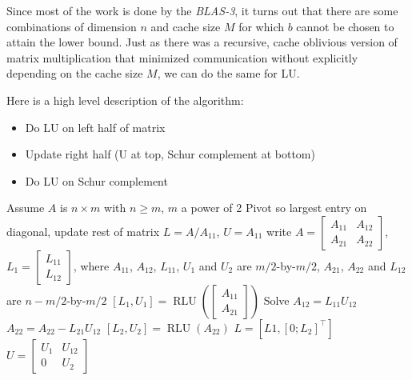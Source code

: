\documentclass[11pt]{article}
\numberwithin{equation}{section}
\begin{document}
Since most of the work is done by the \textit{BLAS-3}, it turns out that there are some combinations of dimension $n$ and cache size $M$ for which $b$ cannot be chosen to attain the lower bound.
Just as there was a recursive, cache oblivious version of matrix multiplication that minimized communication without explicitly depending on the cache size $M$,
we can do the same for LU.

Here is a high level description of the algorithm: \begin{itemize}
    \item Do LU on left half of matrix
    \item Update right half (U at top, Schur complement at bottom)
    \item Do LU on Schur complement
\end{itemize}

\begin{algorithmfrm}
    \begin{algorithmic}[1]
        \State Assume $A$ is $n \times m$ with $n \geq m$, $m$ a power of 2
         
            \State Pivot so largest entry on diagonal, update rest of matrix
            \State $L = A/A_{11}$, $U = A_{11}$
        \Else
            \State write $A=\left[\begin{array}{ll}
                A_{11} & A_{12} \\
                A_{21} & A_{22}
                \end{array}\right]$, $L_{1}=\left[\begin{array}{l}
                    L_{11} \\
                    L_{12}
                    \end{array}\right]$, where $A_{11}$, $A_{12}$, $L_{11}$, $U_1$ and $U_2$ are $m/2$-by-$m/2$, 
                    $A_{21}$, $A_{22}$ and $L_{12}$ are $n-m/2$-by-$m/2$
            \State $[L_1,U_1] = \operatorname{RLU}\left( \left[\begin{array}{c}
                A_{11} \\
                A_{21}
                \end{array}\right] \right)$ 
            \State Solve $A_{12}=L_{11} U_{12}$ 
            \State $A_{22} = A_{22} - L_{21} U_{12}$ 
            \State $[L_2,U_2] = \operatorname{RLU}(A_{22})$ 
            \State $L = [ L1, [0;L_2]^\top ]$ 
            \State $U=\left[\begin{array}{ll}
                U_{1} & U_{12} \\
                0 & U_{2}
                \end{array}\right]$
        \EndIf
    \end{algorithmic}
\end{algorithmfrm}
\end{document}
